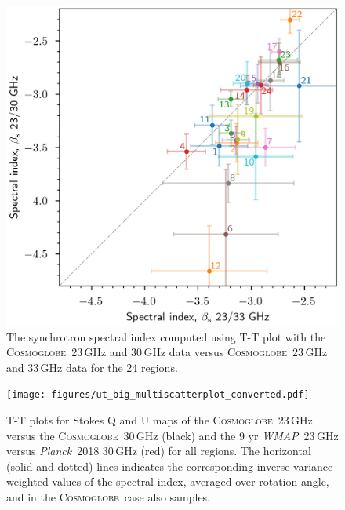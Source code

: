 \documentclass[twocolumn]{../../common/aa}
\def\WMAP{\emph{WMAP}}
\def\Planck{\emph{Planck}}
\newcommand{\Cosmoglobe}{\textsc{Cosmoglobe}}
\begin{document}
\begin{figure}
        \centering
        \includegraphics[width=\linewidth]{figures/xy_regions.png}
        \caption{
The synchrotron spectral index computed using T-T plot with the \Cosmoglobe\ 23\,GHz and 30\,GHz data versus \Cosmoglobe\ 23\,GHz and 33\,GHz data for the 24 regions.}
        \label{fig:cos30_xyplot}
\end{figure}

\begin{figure}
        \centering
        \texttt{[image: figures/ut\_big\_multiscatterplot\_converted.pdf]}
        \caption{T-T plots for Stokes Q and U maps of the \Cosmoglobe\ 23\,GHz versus the \Cosmoglobe\ 30\,GHz (black) and the 9 yr \WMAP\ 23\,GHz versus \Planck\ 2018 30\,GHz (red) for all regions. The horizontal (solid and dotted) lines indicates the corresponding inverse variance weighted values of the spectral index, averaged over rotation angle, and in the \Cosmoglobe\ case also samples.}
        \label{fig:cos30_beta_bigscatter}
\end{figure}
\end{document}
